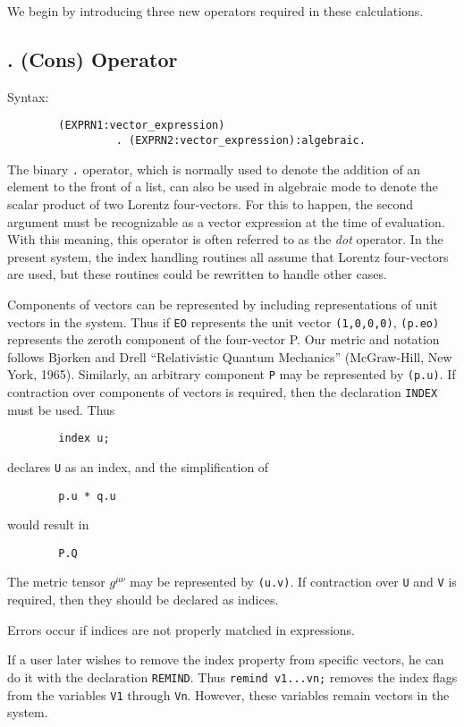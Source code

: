 We begin by introducing three new operators required in these calculations.

\subsection{. (Cons) Operator}
Syntax:
\begin{verbatim}
        (EXPRN1:vector_expression)
                 . (EXPRN2:vector_expression):algebraic.
\end{verbatim}
The binary {\tt .} operator, which is normally used to denote the addition
of an element to the front of a list, can also be used in algebraic mode
to denote the scalar product of two Lorentz four-vectors.  For this to
happen, the second argument must be recognizable as a vector expression
 at the time of
evaluation.  With this meaning, this operator is often referred to as the
{\em dot\/} operator.  In the present system, the index handling routines all
assume that Lorentz four-vectors are used, but these routines could be
rewritten to handle other cases.

Components of vectors can be represented by including representations of
unit vectors in the system.  Thus if {\tt EO} represents the unit vector
{\tt (1,0,0,0)}, {\tt (p.eo)} represents the zeroth component of the
four-vector P.  Our metric and notation follows Bjorken and Drell
``Relativistic Quantum Mechanics'' (McGraw-Hill, New York, 1965).
Similarly, an arbitrary component {\tt P} may be represented by
{\tt (p.u)}.  If contraction over components of vectors is required, then
the declaration {\tt INDEX} must be used.  Thus
\begin{verbatim}
        index u;
\end{verbatim}
declares {\tt U} as an index, and the simplification of
\begin{verbatim}
        p.u * q.u
\end{verbatim}
would result in
\begin{verbatim}
        P.Q
\end{verbatim}
The metric tensor $g^{\mu \nu}$ may be represented by {\tt (u.v)}.  If
contraction over {\tt U} and {\tt V} is required, then they should be
declared as indices.

Errors occur if indices are not properly matched in expressions.

If a user later wishes to remove the index property from specific vectors,
he can do it with the declaration {\tt REMIND}. Thus
{\tt remind v1...vn;} removes the index flags from the variables {\tt V1}
through {\tt Vn}.  However, these variables remain vectors in the system.

